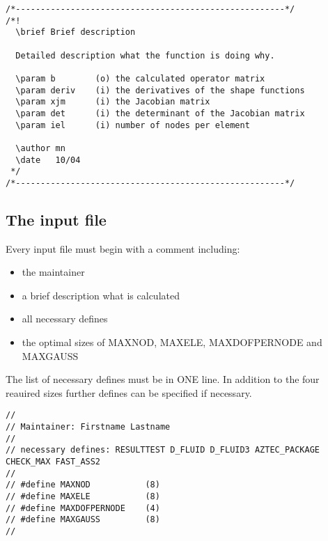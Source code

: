 \begin{verbatim}
/*------------------------------------------------------*/
/*!
  \brief Brief description

  Detailed description what the function is doing why.

  \param b        (o) the calculated operator matrix
  \param deriv    (i) the derivatives of the shape functions
  \param xjm      (i) the Jacobian matrix
  \param det      (i) the determinant of the Jacobian matrix
  \param iel      (i) number of nodes per element

  \author mn
  \date   10/04
 */
/*------------------------------------------------------*/
\end{verbatim}

\subsection{The input file}

Every input file must begin with a comment including: 

\begin{itemize}
\item the maintainer
\item a brief description what is calculated
\item all necessary defines
\item the optimal sizes of MAXNOD, MAXELE, MAXDOFPERNODE and MAXGAUSS
\end{itemize}

The list of necessary defines must be in ONE line. In addition to the
four reauired sizes further defines can be specified if necessary.  

\begin{verbatim}
//
// Maintainer: Firstname Lastname
//
// necessary defines: RESULTTEST D_FLUID D_FLUID3 AZTEC_PACKAGE CHECK_MAX FAST_ASS2
//
// #define MAXNOD           (8)
// #define MAXELE           (8)
// #define MAXDOFPERNODE    (4)
// #define MAXGAUSS         (8)
//
\end{verbatim}